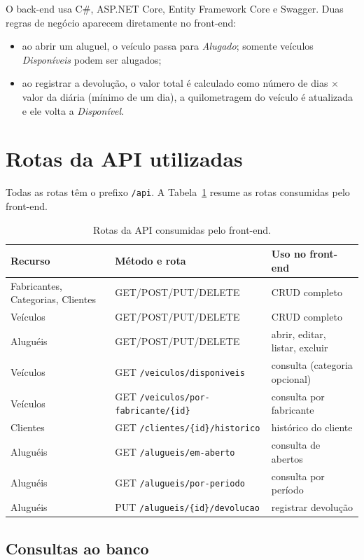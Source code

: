 \documentclass[12pt]{article}
\begin{document}
O back-end usa C\#, ASP.NET Core, Entity Framework Core e Swagger. Duas regras de negócio aparecem diretamente no front-end:
\begin{itemize}
  \item ao abrir um aluguel, o veículo passa para \textit{Alugado}; somente veículos \textit{Disponíveis} podem ser alugados;
  \item ao registrar a devolução, o valor total é calculado como número de dias $\times$ valor da diária (mínimo de um dia), a quilometragem do veículo é atualizada e ele volta a \textit{Disponível}.
\end{itemize}

\section{Rotas da API utilizadas}

Todas as rotas têm o prefixo \texttt{/api}. A Tabela~\ref{tab:rotas} resume as rotas consumidas pelo front-end.

\begin{table}[ht]
\centering
\small
\begin{tabular}{@{}lll@{}}
\toprule
\textbf{Recurso} & \textbf{Método e rota} & \textbf{Uso no front-end}\\
\midrule
Fabricantes, Categorias, Clientes & GET/POST/PUT/DELETE & CRUD completo\\
Veículos & GET/POST/PUT/DELETE & CRUD completo\\
Aluguéis & GET/POST/PUT/DELETE & abrir, editar, listar, excluir\\
\midrule
Veículos & GET \texttt{/veiculos/disponiveis} & consulta (categoria opcional)\\
Veículos & GET \texttt{/veiculos/por-fabricante/\{id\}} & consulta por fabricante\\
Clientes & GET \texttt{/clientes/\{id\}/historico} & histórico do cliente\\
Aluguéis & GET \texttt{/alugueis/em-aberto} & consulta de abertos\\
Aluguéis & GET \texttt{/alugueis/por-periodo} & consulta por período\\
Aluguéis & PUT \texttt{/alugueis/\{id\}/devolucao} & registrar devolução\\
\bottomrule
\end{tabular}
\caption{Rotas da API consumidas pelo front-end.}
\label{tab:rotas}
\end{table}

\subsection{Consultas ao banco}
\end{document}
